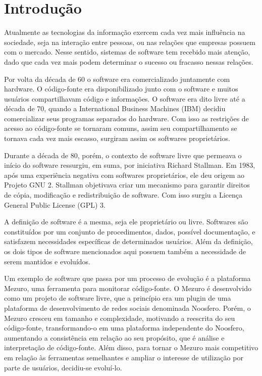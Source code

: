 \chapter{Introdução}
\label{cap-introducao}

Atualmente as tecnologias da informação exercem cada vez mais influência na sociedade, seja na interação entre pessoas, ou nas relações que empresas possuem com o mercado. Nesse sentido, sistemas de software tem recebido mais atenção, dado que cada vez mais podem determinar o sucesso ou fracasso nessas relações.

Por volta da década de 60 o software era comercializado juntamente com hardware. O código-fonte era disponibilizado junto com o software e muitos usuários compartilhavam código e informações. O software era dito livre até a década de 70, quando a International Business Machines (IBM) decidiu comercializar seus programas separados do hardware. Com isso as restrições de acesso ao código-fonte se tornaram comuns, assim seu compartilhamento se tornava cada vez mais escasso, surgiram assim os softwares proprietários.

Durante a década de 80, porém, o contexto de software livre que permeava o início do software ressurgiu, em suma, por iniciativa Richard Stallman. Em 1983, após uma experiência negativa com softwares proprietários, ele deu origem ao Projeto GNU 2. Stallman objetivava criar um mecanismo para garantir direitos de cópia, modificação e redistribuição de software. Com isso surgiu a Licença General Public License (GPL) 3.

A definição de software é a mesma, seja ele proprietário ou livre. Softwares são constituídos por um conjunto de procedimentos, dados, possível documentação, e satisfazem necessidades específicas de determinados usuários. Além da definição, os dois tipos de software mencionados aqui possuem também a necessidade de serem mantidos e evoluídos.

Um exemplo de software que passa por um processo de evolução é a plataforma Mezuro, uma ferramenta para monitorar código-fonte. O Mezuro é desenvolvido como um projeto de software livre, que a princípio era um plugin de uma plataforma de desenvolvimento de redes sociais denominada Noosfero. Porém, o Mezuro cresceu em tamanho e complexidade, motivando a reescrita do seu código-fonte, transformando-o em uma plataforma independente do Noosfero, aumentando a consistência em relação ao seu propósito, que é análise e interpretação de código-fonte. Além disso,  para tornar o Mezuro mais competitivo em relação às ferramentas semelhantes e ampliar o interesse de utilização por parte de usuários, decidiu-se evoluí-lo.

